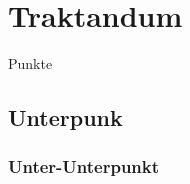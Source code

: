 \documentclass[12pt]{meetingminsde} %
\begin{document}
    \maketitle

    \section{Traktandum}
        \begin{items}
            \item Punkte
        \end{items}
        \subsection{Unterpunk}
            \subsubsection{Unter-Unterpunkt}

\end{document}
